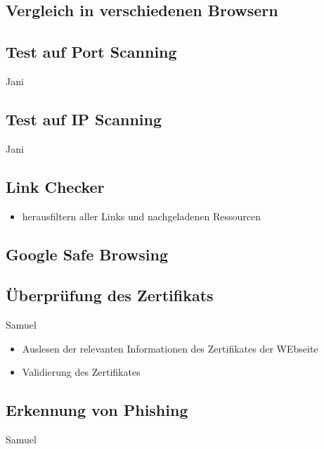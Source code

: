 \subsection{Vergleich in verschiedenen Browsern}

\subsection{Test auf Port Scanning}

\todo Jani

\subsection{Test auf IP Scanning}

\todo Jani

\subsection{Link Checker}
\begin{itemize}
  \item herausfiltern aller Links und nachgeladenen Ressourcen
\end{itemize}

\subsection{Google Safe Browsing}

\subsection{Überprüfung des Zertifikats}

\todo Samuel

\begin{itemize}
  \item Auslesen der relevanten Informationen des Zertifikates der WEbseite
  \item Validierung des Zertifikates
\end{itemize}

\subsection{Erkennung von Phishing}

\todo Samuel

